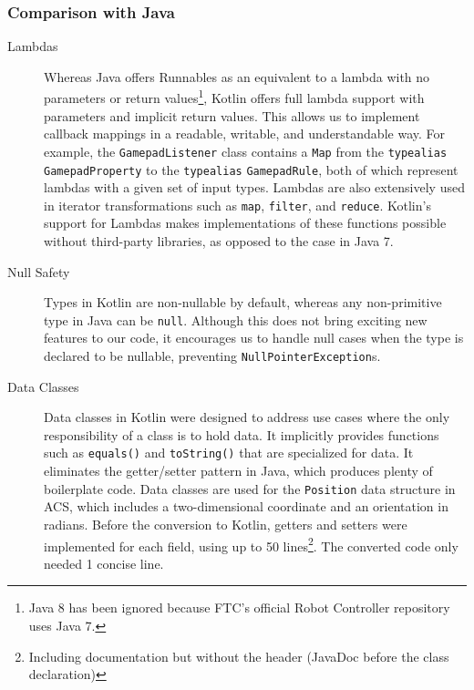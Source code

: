 \documentclass{article}
\begin{document}
\subsubsection{Comparison with Java}
\begin{description}

\item[Lambdas]
Whereas Java offers Runnables as an equivalent to a lambda with no parameters or return values\footnote{Java 8 has been ignored because FTC's official Robot Controller repository uses Java 7.}, Kotlin offers full lambda support with parameters and implicit return values. This allows us to implement callback mappings in a readable, writable, and understandable way. For example, the \texttt{GamepadListener} class contains a \texttt{Map} from the \texttt{typealias} \texttt{GamepadProperty} to the \texttt{typealias} \texttt{GamepadRule}, both of which represent lambdas with a given set of input types. Lambdas are also extensively used in iterator transformations such as \texttt{map}, \texttt{filter}, and \texttt{reduce}. Kotlin's support for Lambdas makes implementations of these functions possible without third-party libraries, as opposed to the case in Java 7.

\item[Null Safety]
Types in Kotlin are non-nullable by default, whereas any non-primitive type in Java can be \texttt{null}. Although this does not bring exciting new features to our code, it encourages us to handle null cases when the type is declared to be nullable, preventing \texttt{NullPointerException}s.

\item[Data Classes]
Data classes in Kotlin were designed to address use cases where the only responsibility of a class is to hold data. It implicitly provides functions such as \texttt{equals()} and \texttt{toString()} that are specialized for data. It eliminates the getter/setter pattern in Java, which produces plenty of boilerplate code. Data classes are used for the \texttt{Position} data structure in ACS, which includes a two-dimensional coordinate and an orientation in radians. Before the conversion to Kotlin, getters and setters were implemented for each field, using up to 50 lines\footnote{Including documentation but without the header (JavaDoc before the class declaration)}. The converted code only needed 1 concise line.

\end{description}
\end{document}

